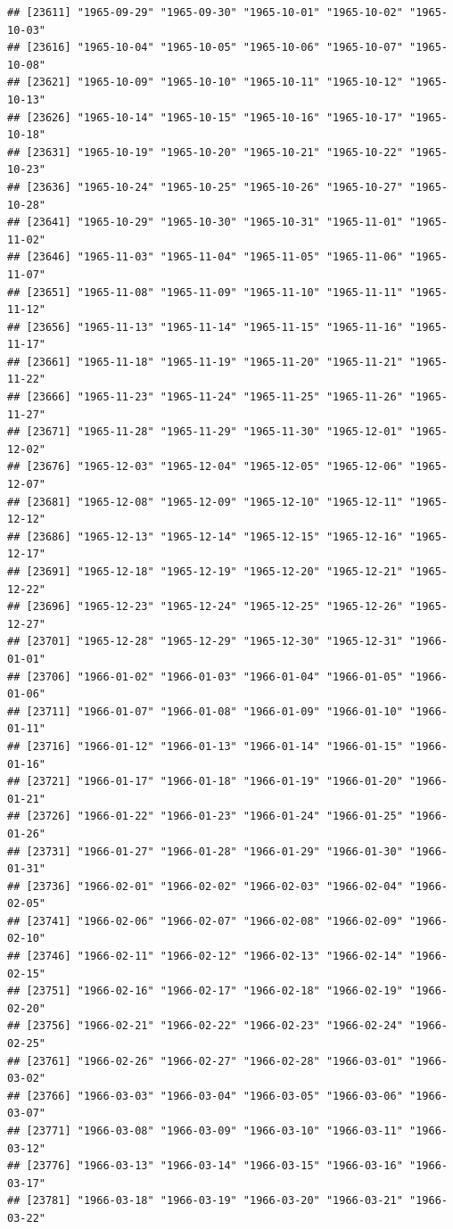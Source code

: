 \documentclass{article}\usepackage[]{graphicx}\usepackage[]{color}
\makeatletter
\newenvironment{kframe}{%
 \def\at@end@of@kframe{}%
 \ifinner\ifhmode%
  \def\at@end@of@kframe{\end{minipage}}%
  \begin{minipage}{\columnwidth}%
 \fi\fi%
 \def\FrameCommand##1{\hskip\@totalleftmargin \hskip-\fboxsep
 \colorbox{shadecolor}{##1}\hskip-\fboxsep
     \hskip-\linewidth \hskip-\@totalleftmargin \hskip\columnwidth}%
 \MakeFramed {\advance\hsize-\width
   \@totalleftmargin\z@ \linewidth\hsize
   \@setminipage}}%
 {\par\unskip\endMakeFramed%
 \at@end@of@kframe}
\newenvironment{knitrout}{}{} %
\makeatother
\begin{document}
\begin{description}
\begin{knitrout}
\begin{kframe}
\begin{verbatim}
## [23611] "1965-09-29" "1965-09-30" "1965-10-01" "1965-10-02" "1965-10-03"
## [23616] "1965-10-04" "1965-10-05" "1965-10-06" "1965-10-07" "1965-10-08"
## [23621] "1965-10-09" "1965-10-10" "1965-10-11" "1965-10-12" "1965-10-13"
## [23626] "1965-10-14" "1965-10-15" "1965-10-16" "1965-10-17" "1965-10-18"
## [23631] "1965-10-19" "1965-10-20" "1965-10-21" "1965-10-22" "1965-10-23"
## [23636] "1965-10-24" "1965-10-25" "1965-10-26" "1965-10-27" "1965-10-28"
## [23641] "1965-10-29" "1965-10-30" "1965-10-31" "1965-11-01" "1965-11-02"
## [23646] "1965-11-03" "1965-11-04" "1965-11-05" "1965-11-06" "1965-11-07"
## [23651] "1965-11-08" "1965-11-09" "1965-11-10" "1965-11-11" "1965-11-12"
## [23656] "1965-11-13" "1965-11-14" "1965-11-15" "1965-11-16" "1965-11-17"
## [23661] "1965-11-18" "1965-11-19" "1965-11-20" "1965-11-21" "1965-11-22"
## [23666] "1965-11-23" "1965-11-24" "1965-11-25" "1965-11-26" "1965-11-27"
## [23671] "1965-11-28" "1965-11-29" "1965-11-30" "1965-12-01" "1965-12-02"
## [23676] "1965-12-03" "1965-12-04" "1965-12-05" "1965-12-06" "1965-12-07"
## [23681] "1965-12-08" "1965-12-09" "1965-12-10" "1965-12-11" "1965-12-12"
## [23686] "1965-12-13" "1965-12-14" "1965-12-15" "1965-12-16" "1965-12-17"
## [23691] "1965-12-18" "1965-12-19" "1965-12-20" "1965-12-21" "1965-12-22"
## [23696] "1965-12-23" "1965-12-24" "1965-12-25" "1965-12-26" "1965-12-27"
## [23701] "1965-12-28" "1965-12-29" "1965-12-30" "1965-12-31" "1966-01-01"
## [23706] "1966-01-02" "1966-01-03" "1966-01-04" "1966-01-05" "1966-01-06"
## [23711] "1966-01-07" "1966-01-08" "1966-01-09" "1966-01-10" "1966-01-11"
## [23716] "1966-01-12" "1966-01-13" "1966-01-14" "1966-01-15" "1966-01-16"
## [23721] "1966-01-17" "1966-01-18" "1966-01-19" "1966-01-20" "1966-01-21"
## [23726] "1966-01-22" "1966-01-23" "1966-01-24" "1966-01-25" "1966-01-26"
## [23731] "1966-01-27" "1966-01-28" "1966-01-29" "1966-01-30" "1966-01-31"
## [23736] "1966-02-01" "1966-02-02" "1966-02-03" "1966-02-04" "1966-02-05"
## [23741] "1966-02-06" "1966-02-07" "1966-02-08" "1966-02-09" "1966-02-10"
## [23746] "1966-02-11" "1966-02-12" "1966-02-13" "1966-02-14" "1966-02-15"
## [23751] "1966-02-16" "1966-02-17" "1966-02-18" "1966-02-19" "1966-02-20"
## [23756] "1966-02-21" "1966-02-22" "1966-02-23" "1966-02-24" "1966-02-25"
## [23761] "1966-02-26" "1966-02-27" "1966-02-28" "1966-03-01" "1966-03-02"
## [23766] "1966-03-03" "1966-03-04" "1966-03-05" "1966-03-06" "1966-03-07"
## [23771] "1966-03-08" "1966-03-09" "1966-03-10" "1966-03-11" "1966-03-12"
## [23776] "1966-03-13" "1966-03-14" "1966-03-15" "1966-03-16" "1966-03-17"
## [23781] "1966-03-18" "1966-03-19" "1966-03-20" "1966-03-21" "1966-03-22"

\end{verbatim}
\end{kframe}
\end{knitrout}
\end{description}
\end{document}
